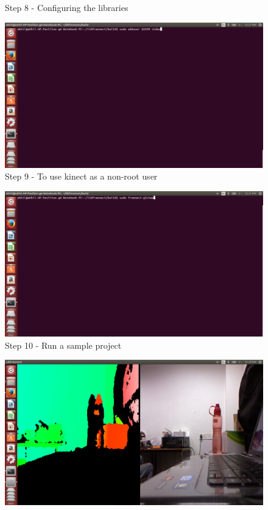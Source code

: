 \begin{flushleft}
\begin{figure}
\begin{center}
\end{center}
\caption{Step 8 - Configuring the libraries}
\label{fig:w18}
\end{figure}
\medskip
\begin{figure}
\begin{center}
\includegraphics[scale=0.35]{step10}
\end{center}
\caption{Step 9 - To use kinect as a non-root user}
\label{fig:w19}
\end{figure}
\medskip
\begin{figure}
\begin{center}
\includegraphics[scale=0.35]{step12}
\end{center}
\caption{Step 10 - Run a sample project}
\label{fig:w20}
\end{figure}
\medskip
\begin{figure}
\begin{center}
\includegraphics[scale=0.35]{step11}

\end{center}
\end{figure}
\end{flushleft}
